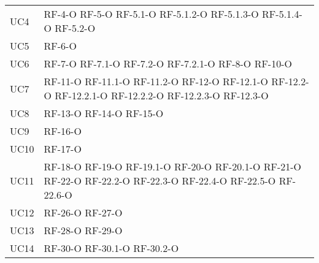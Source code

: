 \begin{longtable}{ 
		>{}p{} 
		>{}p{} }
UC4 &
RF-4-O \newline
RF-5-O \newline
RF-5.1-O \newline
RF-5.1.2-O \newline
RF-5.1.3-O \newline
RF-5.1.4-O \newline
RF-5.2-O
\tabularnewline

UC5 &
	RF-6-O		\tabularnewline

UC6 &
RF-7-O\newline
RF-7.1-O\newline
RF-7.2-O\newline
RF-7.2.1-O\newline
RF-8-O\newline
RF-10-O
\tabularnewline

UC7 &
RF-11-O \newline
RF-11.1-O \newline
RF-11.2-O \newline
RF-12-O \newline
RF-12.1-O \newline
RF-12.2-O \newline
RF-12.2.1-O \newline
RF-12.2.2-O \newline
RF-12.2.3-O \newline
RF-12.3-O
\tabularnewline

UC8 &
	RF-13-O		\newline
	RF-14-O		\newline
	RF-15-O		
	\tabularnewline
	
UC9 &
	RF-16-O		\tabularnewline
	
UC10 &
	RF-17-O		\tabularnewline

UC11 &
	RF-18-O		\newline
	RF-19-O		\newline
	RF-19.1-O	\newline
	RF-20-O		\newline
	RF-20.1-O	\newline
	RF-21-O		\newline
	RF-22-O		\newline
	RF-22.2-O\newline
	RF-22.3-O\newline
	RF-22.4-O\newline
	RF-22.5-O\newline	
	RF-22.6-O
	\tabularnewline
	
UC12 &
	RF-26-O		\newline
	RF-27-O		\tabularnewline
UC13 &
	RF-28-O		\newline
	RF-29-O		\tabularnewline
UC14 &
	RF-30-O		\newline
	RF-30.1-O	\newline
	RF-30.2-O	\tabularnewline
	

\end{longtable}
